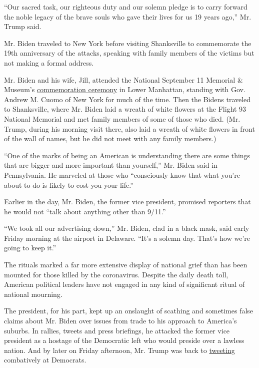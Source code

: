 ``Our sacred task, our righteous duty and our solemn pledge is to carry
forward the noble legacy of the brave souls who gave their lives for us
19 years ago,'' Mr. Trump said.

Mr. Biden traveled to New York before visiting Shanksville to
commemorate the 19th anniversary of the attacks, speaking with family
members of the victims but not making a formal address.

Mr. Biden and his wife, Jill, attended the National September 11
Memorial \& Museum's
\href{https://www.nytimes3xbfgragh.onion/2020/09/11/nyregion/9-11-ceremony-September-11th.html}{commemoration
ceremony} in Lower Manhattan, standing with Gov. Andrew M. Cuomo of New
York for much of the time. Then the Bidens traveled to Shanksville,
where Mr. Biden laid a wreath of white flowers at the Flight 93 National
Memorial and met family members of some of those who died. (Mr. Trump,
during his morning visit there, also laid a wreath of white flowers in
front of the wall of names, but he did not meet with any family
members.)

``One of the marks of being an American is understanding there are some
things that are bigger and more important than yourself,'' Mr. Biden
said in Pennsylvania. He marveled at those who ``consciously know that
what you're about to do is likely to cost you your life.''

Earlier in the day, Mr. Biden, the former vice president, promised
reporters that he would not ``talk about anything other than 9/11.''

``We took all our advertising down,'' Mr. Biden, clad in a black mask,
said early Friday morning at the airport in Delaware. ``It's a solemn
day. That's how we're going to keep it.''

The rituals marked a far more extensive display of national grief than
has been mounted for those killed by the coronavirus. Despite the daily
death toll, American political leaders have not engaged in any kind of
significant ritual of national mourning.

The president, for his part, kept up an onslaught of scathing and
sometimes false claims about Mr. Biden over issues from trade to his
approach to America's suburbs. In rallies, tweets and press briefings,
he attacked the former vice president as a hostage of the Democratic
left who would preside over a lawless nation. And by later on Friday
afternoon, Mr. Trump was back to
\href{https://twitter.com/realDonaldTrump/status/1304511871152795650?s=20}{tweeting}
combatively at Democrats.

